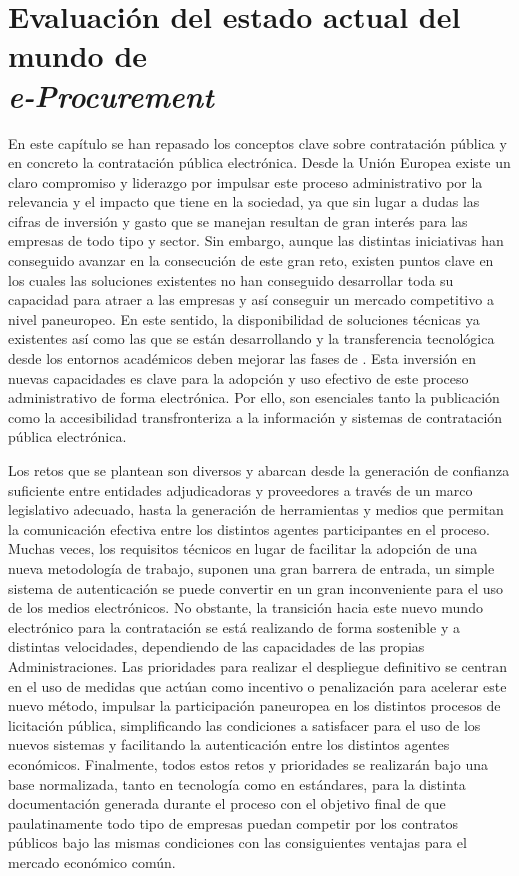 \section{Evaluación del estado actual del mundo de\\ \textit{e-Procurement}}
En este capítulo se han repasado los conceptos clave sobre contratación
pública y en concreto la contratación pública electrónica. Desde la
Unión Europea existe un claro compromiso y liderazgo por impulsar este proceso
administrativo por la relevancia y el impacto que tiene en la sociedad, ya que sin lugar a dudas las cifras de inversión y gasto que se manejan
resultan de gran interés para las empresas de todo tipo y sector. Sin embargo, aunque las distintas iniciativas han conseguido avanzar en la 
consecución de este gran reto, existen puntos clave en los cuales las soluciones existentes no han
conseguido desarrollar toda su capacidad para atraer a las empresas
y así conseguir un mercado competitivo a nivel paneuropeo. En este sentido,
la disponibilidad de soluciones técnicas ya existentes así como las que
se están desarrollando y la transferencia tecnológica desde los entornos
académicos deben mejorar las fases de \eproc. Esta inversión
en nuevas capacidades es clave para la adopción y uso efectivo de este proceso administrativo
de forma electrónica. Por ello, son esenciales tanto la publicación como la accesibilidad transfronteriza
a la información y sistemas de contratación pública electrónica. 

Los retos que se plantean son diversos y abarcan desde la generación de confianza suficiente
entre entidades adjudicadoras y proveedores a través de un marco legislativo adecuado, hasta
la generación de herramientas y medios que permitan la comunicación efectiva entre los distintos
agentes participantes en el proceso. Muchas veces, los requisitos técnicos en lugar de facilitar
la adopción de una nueva metodología de trabajo, suponen una gran barrera de entrada, un simple sistema de autenticación se puede
convertir en un gran inconveniente para el uso de los medios electrónicos. No obstante,
la transición hacia este nuevo mundo electrónico para la contratación se está realizando
de forma sostenible y a distintas velocidades, dependiendo de las capacidades de las propias
Administraciones. Las prioridades para realizar el despliegue definitivo se centran en el uso
de medidas que actúan como incentivo o penalización para acelerar este nuevo método, impulsar
la participación paneuropea en los distintos procesos de licitación pública, simplificando 
las condiciones a satisfacer para el uso de los nuevos sistemas y facilitando la autenticación
entre los distintos agentes económicos. Finalmente, todos estos retos y prioridades se realizarán
bajo una base normalizada, tanto en tecnología como en estándares, para la distinta documentación
generada durante el proceso con el objetivo final de que paulatinamente todo tipo de empresas
puedan competir por los contratos públicos bajo las mismas condiciones con las consiguientes
ventajas para el mercado económico común.

